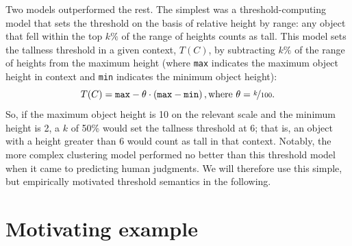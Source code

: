 \documentclass[10pt,a4paper]{article}
\begin{document}
Two models outperformed the rest. The simplest was a threshold-computing model that sets the threshold on the basis of relative height by range: any object that fell within the top $k\%$ of the range of heights counts as tall. This model sets the tallness threshold in a given context, $T(C)$, by subtracting $k\%$ of the range of heights from the maximum height (where \texttt{max} indicates the maximum object height in context and \texttt{min} indicates the minimum object height):
$$T(C) = \texttt{max} - \theta \cdot (\texttt{max} - \texttt{min})\,, \text{where $\theta = \nicefrac{k}{100}$.}$$
So, if the maximum object height is 10 on the relevant scale and the minimum height is 2, a $k$ of 50\% would set the tallness threshold at 6; that is, an object with a height greater than 6 would count as tall in that context. Notably, the more complex clustering model performed no better than this threshold model when it came to predicting human judgments.
We will therefore use this simple, but empirically motivated threshold semantics in the following.

%
%
%
%
%
%
%
%
%
%

\section{Motivating example}
\end{document}
